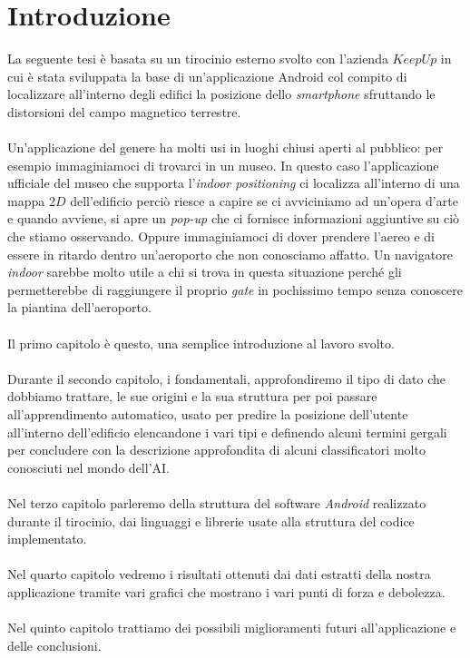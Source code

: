 \chapter{Introduzione}
La seguente tesi \`e basata su un tirocinio esterno svolto con l'azienda $KeepUp$ in cui \`e stata sviluppata la base di un'applicazione Android col compito di localizzare all'interno degli edifici la posizione dello \textit{smartphone} sfruttando le distorsioni del campo magnetico terrestre\cite{6418880}.
\\\\
Un'applicazione del genere ha molti usi in luoghi chiusi aperti al pubblico: per esempio immaginiamoci di trovarci in un museo. In questo caso l'applicazione ufficiale del museo che supporta l'\textit{indoor positioning} ci localizza all'interno di una mappa $2D$ dell'edificio perci\`o riesce a capire se ci avviciniamo ad un'opera d'arte e quando avviene, si apre un \textit{pop-up} che ci fornisce informazioni aggiuntive su ci\`o che stiamo osservando. Oppure immaginiamoci di dover prendere l'aereo e di essere in ritardo dentro un'aeroporto che non conosciamo affatto. Un navigatore \textit{indoor} sarebbe molto utile a chi si trova in questa situazione perch\'e gli permetterebbe di raggiungere il proprio \textit{gate} in pochissimo tempo senza conoscere la piantina dell'aeroporto.
\\\\
Il primo capitolo \`e questo, una semplice introduzione al lavoro svolto.
\\\\
Durante il secondo capitolo, i fondamentali, approfondiremo il tipo di dato che dobbiamo trattare, le sue origini e la sua struttura per poi passare all'apprendimento automatico, usato per predire la posizione dell'utente all'interno dell'edificio elencandone i vari tipi e definendo alcuni termini gergali per concludere con la descrizione approfondita di alcuni classificatori molto conosciuti nel mondo dell'AI.
\\\\
Nel terzo capitolo parleremo della struttura del software \textit{Android} realizzato durante il tirocinio, dai linguaggi e librerie usate alla struttura del codice implementato.
\\\\
Nel quarto capitolo vedremo i risultati ottenuti dai dati estratti della nostra applicazione tramite vari grafici che mostrano i vari punti di forza e debolezza.
\\\\
Nel quinto capitolo trattiamo dei possibili miglioramenti futuri all'applicazione e delle conclusioni.